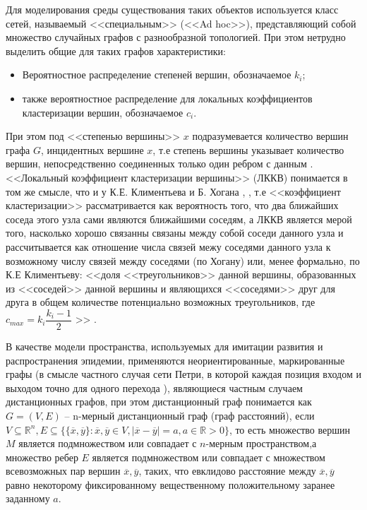 Для моделирования среды существования таких объектов используется класс сетей, называемый <<специальным>> (<<Ad hoc>>), представляющий собой множество случайных графов с разнообразной топологией. При этом нетрудно выделить общие для таких графов характеристики: 
\begin{itemize}
	\item Вероятностное распределение степеней вершин, обозначаемое $k_i$;
	\item также вероятностное распределение для локальных коэффициентов кластеризации вершин, обозначаемое $c_i$.
\end{itemize}
При этом под <<степенью вершины>> 	$x$ подразумевается количество вершин графа $G$, инцидентных вершине $x$, т.е степень вершины указывает количество вершин, непосредственно соединенных только один ребром с данным %
\cite[с. 5]{DiestelR:2005} .
<<Локальный 	коэффициент кластеризации вершины>> (ЛККВ) понимается в том же смысле, что и у К.Е. Климентьева и Б. Хогана %
\cite{Klimentiev:2015}, \cite{Hogan:2017}, т.е <<коэффициент кластеризации>> рассматривается как вероятность того, что два ближайших соседа этого узла сами являются ближайшими соседям, а ЛККВ является мерой того, насколько хорошо связанны связаны между собой соседи данного узла и рассчитывается как отношение
числа связей межу соседями данного узла к возможному числу связей между соседями  (по Хогану) или, менее формально, по К.Е Климентьеву: <<доля <<треугольников>> данной вершины, образованных из <<соседей>> данной вершины и являющихся <<соседями>> друг для друга в общем количестве потенциально возможных треугольников, где $c_{max}=k_i\dfrac{k_i-1}{2}$ >> \cite{Klimentiev:2015}.


В качестве модели пространства, используемых для имитации развития и распространения эпидемии, применяются неориентированные, маркированные графы (в смысле частного случая сети Петри, в которой каждая позиция входом и выходом точно для одного перехода %
\cite[с. 200]{Piterson:1981} ), являющиеся частным случаем дистанционных графов, при этом дистанционный граф понимается как $G = (V,E)$ -- n-мерный дистанционный граф  (граф расстояний), если $V \subseteq \mathbb{R}^n, E \subseteq \{\{\overline{x}, \overline{y} \}: \overline{x}, \overline{y} \in V, |\overline{x} - \overline{y}| = a, a \in \mathbb{R} > 0 \}$, то есть множество вершин $M$ является подмножеством или совпадает с  $n$-мерным пространством,а множество ребер $E$ является подмножеством или совпадает с множеством всевозможных пар вершин $\overline{x}, \overline{y}$, таких, что  евклидово расстояние между $\overline{x}, \overline{y}$ равно некоторому фиксированному вещественному положительному заранее заданному $a$. 


